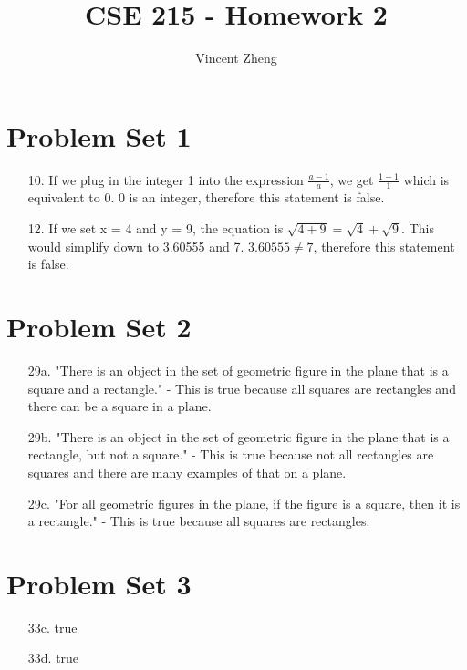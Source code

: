 \documentclass[12pt]{article}
\author{Vincent Zheng}
\begin{document}
\title{CSE 215 - Homework 2}
\maketitle

\section*{Problem Set 1}
\begin{itemize}
    \item [10.]
        If we plug in the integer 1 into the expression $\frac{a - 1}{a}$, we get
        $\frac{1 - 1}{1}$ which is equivalent to 0. 0 is an integer, therefore this
        statement is false.
    \item [12.]
        If we set x = 4 and y = 9, the equation is $\sqrt{4 + 9} = \sqrt{4} + \sqrt{9}$.
        This would simplify down to 3.60555 and 7. $3.60555 \neq 7$, therefore this
        statement is false. 
\end{itemize}

\section*{Problem Set 2}
\begin{itemize}
    \item [29a.]
        "There is an object in the set of geometric figure in the plane that is a
        square and a rectangle." - This is true because all squares are rectangles and
        there can be a square in a plane.
    \item [29b.]
        "There is an object in the set of geometric figure in the plane that is a
        rectangle, but not a square." - This is true because not all rectangles are
        squares and there are many examples of that on a plane.
    \item [29c.]
        "For all geometric figures in the plane, if the figure is a square, then it is
        a rectangle." - This is true because all squares are rectangles.
\end{itemize}

\section*{Problem Set 3}
\begin{itemize}
    \item [33c.]
        true
    \item [33d.]
        true
\end{itemize}
\end{document}
